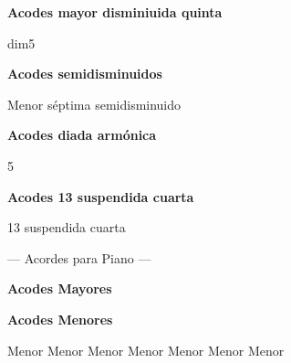 \vskip 20pt
\textbf{Acodes mayor disminiuida quinta}

\small
{} dim5
\normalsize

\vskip 20pt
\textbf{Acodes semidisminuidos}

\small
{} Menor s\'eptima semidisminuido
\normalsize

\vskip 20pt
\textbf{Acodes diada arm\'onica}

\small
{} 5
\normalsize

\vskip 20pt
\textbf{Acodes 13 suspendida cuarta}

\small
{} 13 suspendida cuarta
\normalsize

\clearpage
\fi

\ifpiano
{}
{\parindent 8pt
        {\myTitleFont --- Acordes para Piano ---}}\par
\vskip 20pt
\textbf{Acodes Mayores}
\vskip 25pt

\small
{} \qquad\qquad {} \qquad\qquad {} \qquad\qquad {} \hfill \break
\vskip 25pt
 \qquad\qquad  {} \qquad\qquad {}
\vskip 25pt
 \qquad\qquad {} \qquad\qquad {} \qquad\qquad {} \hfill \break
\vskip 25pt
 \qquad\qquad {}
\normalsize

\textbf{Acodes Menores}
\vskip 25pt

\small
{} Menor \qquad\qquad {} Menor \qquad\qquad {} Menor \qquad\qquad {} Menor \hfill \break
\vskip 25pt
 Menor \qquad\qquad {} Menor \qquad\qquad {} Menor
\vskip 25pt
  \qquad\qquad  {}  \qquad\qquad  {} \hfill \break
\vskip 25pt
 \qquad\qquad {}  \qquad\qquad  {}
\normalsize

